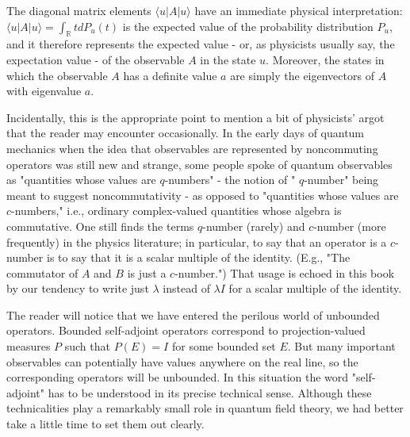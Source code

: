 \documentclass[10pt, letterpaper]{article}
\begin{document}
The diagonal matrix elements $\langle u| A|u\rangle$ have an immediate physical interpretation: $\langle u| A|u\rangle=\int_{\mathbb{R}} t d P_{u}(t)$ is the expected value of the probability distribution $P_{u}$, and it therefore represents the expected value - or, as physicists usually say, the expectation value - of the observable $A$ in the state $u$. Moreover, the states in which the observable $A$ has a definite value $a$ are simply the eigenvectors of $A$ with eigenvalue $a$.

Incidentally, this is the appropriate point to mention a bit of physicists' argot that the reader may encounter occasionally. In the early days of quantum mechanics when the idea that observables are represented by noncommuting operators was still new and strange, some people spoke of quantum observables as "quantities whose values are $q$-numbers" - the notion of " $q$-number" being meant to suggest noncommutativity - as opposed to "quantities whose values are $c$-numbers," i.e., ordinary complex-valued quantities whose algebra is commutative. One still finds the terms $q$-number (rarely) and $c$-number (more frequently) in the physics literature; in particular, to say that an operator is a $c$-number is to say that it is a scalar multiple of the identity. (E.g., "The commutator of $A$ and $B$ is just a $c$-number.") That usage is echoed in this book by our tendency to write just $\lambda$ instead of $\lambda I$ for a scalar multiple of the identity.

The reader will notice that we have entered the perilous world of unbounded operators. Bounded self-adjoint operators correspond to projection-valued measures $P$ such that $P(E)=I$ for some bounded set $E$. But many important observables can potentially have values anywhere on the real line, so the corresponding operators will be unbounded. In this situation the word "self-adjoint" has to be understood in its precise technical sense. Although these technicalities play a remarkably small role in quantum field theory, we had better take a little time to set them out clearly.
\end{document}
